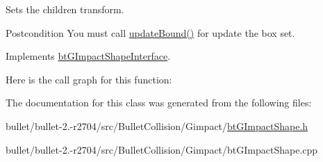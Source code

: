 Sets the children transform. 

\begin{DoxyPostcond}{Postcondition}
You must call \hyperlink{classbt_g_impact_shape_interface_acb26c2d7a2aecabd06b996b72b848492}{update\+Bound()} for update the box set. 
\end{DoxyPostcond}


Implements \hyperlink{classbt_g_impact_shape_interface_a83392f97bd7dfeb71ccdce6913a465b0}{bt\+G\+Impact\+Shape\+Interface}.



Here is the call graph for this function\+:




The documentation for this class was generated from the following files\+:\begin{DoxyCompactItemize}
\item 
bullet/bullet-\/2.-\/r2704/src/\+Bullet\+Collision/\+Gimpact/\hyperlink{bt_g_impact_shape_8h}{bt\+G\+Impact\+Shape.\+h}\item 
bullet/bullet-\/2.-\/r2704/src/\+Bullet\+Collision/\+Gimpact/bt\+G\+Impact\+Shape.\+cpp\end{DoxyCompactItemize}
